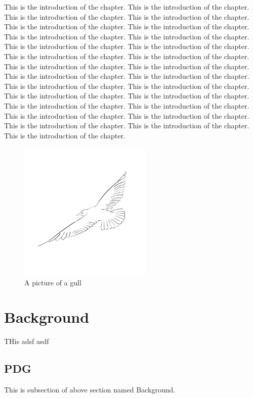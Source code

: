 \documentclass{nithreport}
\begin{document}
This is the introduction of the chapter. This is the introduction of the chapter. This is the introduction of the chapter. This is the introduction of the chapter. This is the introduction of the chapter. This is the introduction of the chapter. This is the introduction of the chapter.\cite{big} This is the introduction of the chapter. This is the introduction of the chapter. This is the introduction of the chapter. This is the introduction of the chapter. This is the introduction of the chapter. This is the introduction of the chapter. This is the introduction of the chapter. This is the introduction of the chapter. This is the introduction of the chapter. This is the introduction of the chapter. This is the introduction of the chapter. This is the introduction of the chapter. This is the introduction of the chapter. This is the introduction of the chapter. This is the introduction of the chapter. This is the introduction of the chapter. This is the introduction of the chapter. This is the introduction of the chapter. This is the introduction of the chapter. This is the introduction of the chapter.

\begin{figure}
  \centering %
  \includegraphics[width=2.5in, keepaspectratio]{gull.jpg}
  \caption{A picture of a gull}
\end{figure}

\section{Background}
THis adsf asdf

\subsection{PDG}
This is subsection of above section named Background.
\end{document}
